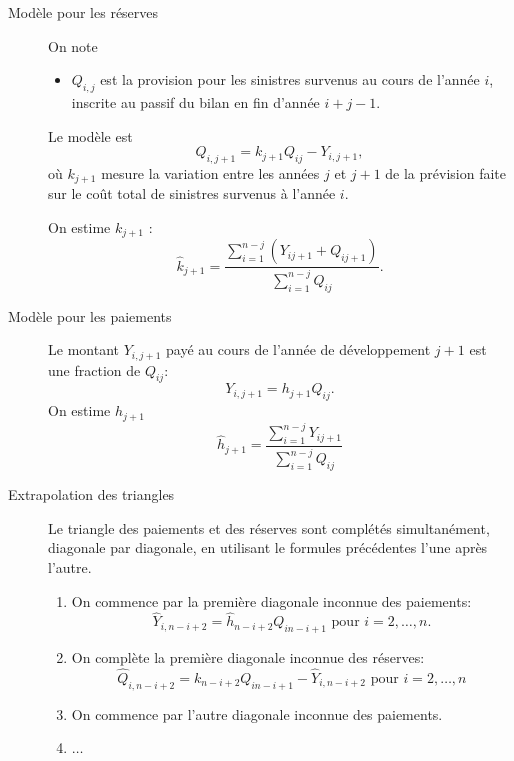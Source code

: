 \begin{description}
\item[Modèle pour les réserves] On note
  \begin{itemize}
  \item $Q_{i,j}$ est la provision pour les sinistres survenus au
    cours de l'année $i$, inscrite au passif du bilan en fin d'année
    $i+j-1$.
  \end{itemize}
  Le modèle est
  \begin{equation*}
    Q_{i, j+1} = k_{j+1} Q_{ij} - Y_{i, j+1},
  \end{equation*}
  où $k_{j+1}$ mesure la variation entre les années $j$ et $j+1$ de la
  prévision faite sur le coût total de sinistres survenus à l'année
  $i$.

  On estime $k_{j+1}$ :
  \begin{equation*}
    \hat{k}_{j+1} = \frac{\sum_{i=1}^{n-j} \left( Y_{i j+1} + Q_{i j+1} \right)}{\sum_{i=1}^{n-j} Q_{i j}}.
  \end{equation*}
\item[Modèle pour les paiements] Le montant $Y_{i, j+1}$ payé au cours
  de l'année de développement $j+1$ est une fraction de $ Q_{ij}$:
  \begin{equation*}
    Y_{i, j+1} = h_{j+1}  Q_{ij}.
  \end{equation*}
  On estime $h_{j+1}$
  \begin{equation*}
    \hat{h}_{j+1} = \frac{\sum_{i=1}^{n-j} Y_{i j+1}}{\sum_{i=1}^{n-j} Q_{i j}}
  \end{equation*}
\item[Extrapolation des triangles] Le triangle des paiements et des
  réserves sont complétés simultanément, diagonale par diagonale, en
  utilisant le formules précédentes l'une après l'autre.
  \begin{enumerate}
  \item On commence par la première diagonale inconnue des paiements:
    \begin{equation*}
      \hat{Y}_{i, n-i+2} = \hat{h}_{n-i+2}  Q_{i n-i+1} \text{ pour } i=2,\ldots,n.
    \end{equation*}
  \item On complète la première diagonale inconnue des réserves:
    \begin{equation*}
      \hat{Q}_{i, n-i+2} = k_{n-i+2} Q_{i n-i+1} - \hat{Y}_{i, n-i+2}
      \text{ pour } i=2, \ldots, n
    \end{equation*}
  \item On commence par l'autre diagonale inconnue des paiements.
  \item $\ldots$
  \end{enumerate}
\end{description}

